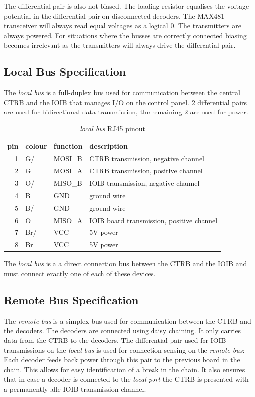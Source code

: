 \documentclass{scrreprt}
\begin{document}
The differential pair is also not biased. The loading resistor equalises the voltage potential in the differential pair on disconnected decoders. The MAX481 transceiver will always read equal voltages as a logical $0$. The transmitters are always powered. For situations where the busses are correctly connected biasing becomes irrelevant as the transmitters will always drive the differential pair.

\subsection{Local Bus Specification}
The \emph{local bus} is a full-duplex bus used for communication between the central CTRB and the IOIB that manages I/O on the control panel. 2 differential pairs are used for bidirectional data transmission, the remaining 2 are used for power.
\begin{table}[h!]
\centering
\begin{tabular}{ |r|l|l|l| }
\hline
pin & colour & function & description \\\hline\hline
  1 & G/     & MOSI\_B  & CTRB transmission, negative channel \\\hline
  2 & G      & MOSI\_A  & CTRB transmission, positive channel \\\hline
  3 & O/     & MISO\_B  & IOIB transmission, negative channel \\\hline
  4 & B      & GND      & ground wire \\\hline
  5 & B/     & GND      & ground wire \\\hline
  6 & O      & MISO\_A  & IOIB board transmission, positive channel \\\hline
  7 & Br/    & VCC      & 5V power \\\hline
  8 & Br     & VCC      & 5V power \\\hline
\end{tabular}
\caption{\emph{local bus} RJ45 pinout}
\end{table}

The \emph{local bus} is a a direct connection bus between the CTRB and the IOIB and must connect exactly one of each of these devices.

\subsection{Remote Bus Specification}
The \emph{remote bus} is a simplex bus used for communication between the CTRB and the decoders. The decoders are connected using daisy chaining. It only carries data from the CTRB to the decoders. The differential pair used for IOIB transmissions on the \emph{local bus} is used for connection sensing on the \emph{remote bus}: Each decoder feeds back power through this pair to the previous board in the chain. This allows for easy identification of a break in the chain. It also ensures that in case a decoder is connected to the \emph{local port} the CTRB is presented with a permanently idle IOIB transmission channel.
\end{document}
